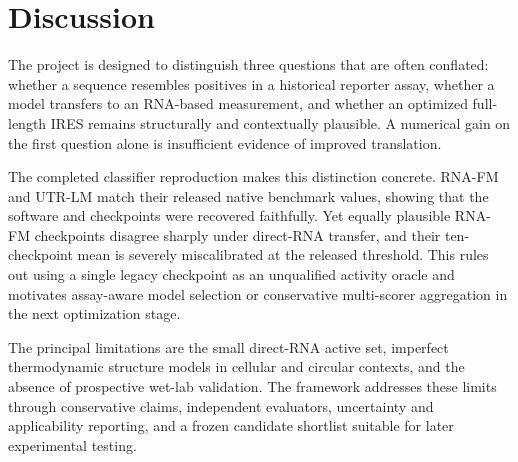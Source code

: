 \section{Discussion}

The project is designed to distinguish three questions that are often conflated: whether a sequence
resembles positives in a historical reporter assay, whether a model transfers to an RNA-based
measurement, and whether an optimized full-length IRES remains structurally and contextually
plausible. A numerical gain on the first question alone is insufficient evidence of improved
translation.

The completed classifier reproduction makes this distinction concrete. RNA-FM and UTR-LM match
their released native benchmark values, showing that the software and checkpoints were recovered
faithfully. Yet equally plausible RNA-FM checkpoints disagree sharply under direct-RNA transfer,
and their ten-checkpoint mean is severely miscalibrated at the released threshold. This rules out
using a single legacy checkpoint as an unqualified activity oracle and motivates assay-aware model
selection or conservative multi-scorer aggregation in the next optimization stage.

The principal limitations are the small direct-RNA active set, imperfect thermodynamic structure
models in cellular and circular contexts, and the absence of prospective wet-lab validation. The
framework addresses these limits through conservative claims, independent evaluators, uncertainty
and applicability reporting, and a frozen candidate shortlist suitable for later experimental
testing.
